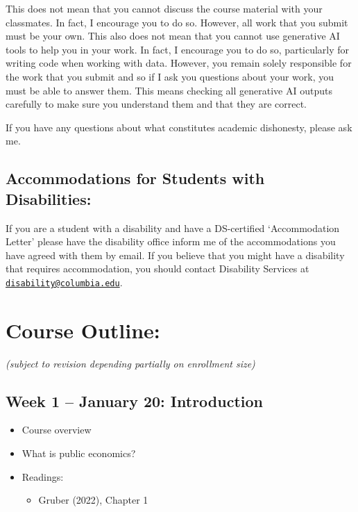 \documentclass[11pt]{article}
\begin{document}
This does not mean that you cannot discuss the course material with your classmates. In fact, I encourage you to do so. However, all work that you submit must be your own. This also does not mean that you cannot use generative AI tools to help you in your work. In fact, I encourage you to do so, particularly for writing code when working with data. However, you remain solely responsible for the work that you submit and so if I ask you questions about your work, you must be able to answer them. This means checking all generative AI outputs carefully to make sure you understand them and that they are correct. 

If you have any questions about what constitutes academic dishonesty, please ask me. 

\subsection*{Accommodations for Students with Disabilities:}
If you are a student with a disability and have a DS-certified `Accommodation Letter' please have the disability office inform me of the accommodations you have agreed with them by email. If you believe that you might have a disability that requires accommodation, you should contact Disability Services at \href{mailto:disability@columbia.edu}{\nolinkurl{disability@columbia.edu}}.

\newpage

\section*{Course Outline:}
\textit{(subject to revision depending partially on enrollment size)}

\subsection*{Week 1 -- January 20: Introduction}
\begin{itemize}
    \setlength{\itemsep}{0em}
    \item Course overview
    \item What is public economics?
    \item Readings:
    \begin{itemize}
        \item Gruber (2022), Chapter 1
    \end{itemize}
\end{itemize}
\end{document}
